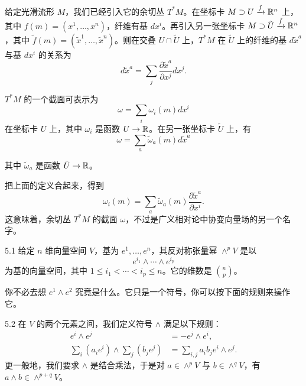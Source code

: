 给定光滑流形 $M$，我们已经引入它的余切丛 $T^*M$。在坐标卡 $M\supset U\xrightarrow{f}\mathbb{R}^n$ 上，其中 $f(m)=(x^1,\dots,x^n)$，纤维有基 $dx^i$。再引入另一张坐标卡 $M\supset\tilde U\xrightarrow{\tilde f}\mathbb{R}^n$，其中 $\tilde f(m)=(\tilde x^1,\dots,\tilde x^n)$。则在交叠 $U\cap\tilde U$ 上，$T^*M$ 在 $\tilde U$ 上的纤维的基 $d\tilde x^a$ 与基 $dx^i$ 的关系为
\begin{equation}
  d\tilde x^a=\sum_j\frac{\partial\tilde x^a}{\partial x^j}dx^j.
  \tag{5.1}
\end{equation}

$T^*M$ 的一个截面可表示为
\begin{equation}
  \omega=\sum_i\omega_i(m)dx^i
  \tag{5.2}
\end{equation}
在坐标卡 $U$ 上，其中 $\omega_i$ 是函数 $U\to\mathbb{R}$。在另一张坐标卡 $\tilde U$ 上，有
\begin{equation}
  \omega=\sum_a\tilde\omega_a(m)d\tilde x^a
  \tag{5.3}
\end{equation}

其中 $\tilde\omega_a$ 是函数 $\tilde U\to\mathbb{R}$。

把上面的定义合起来，得到
\begin{equation}
  \omega_i(m)=\sum_a\tilde\omega_a(m)\frac{\partial\tilde x^a}{\partial x^i}.
  \tag{5.4}
\end{equation}
这意味着，余切丛 $T^*M$ 的截面 $\omega$，不过是广义相对论中协变向量场的另一个名字。

\begin{definition}{5.1}
  给定 $n$ 维向量空间 $V$，基为 $e^1,\dots,e^n$，其反对称张量幂 $\wedge^pV$ 是以
  \begin{equation}
    e^{i_1}\wedge\cdots\wedge e^{i_p}
    \tag{5.5}
  \end{equation}
  为基的向量空间，其中 $1\le i_1<\cdots<i_p\le n$。它的维数是 $\binom{n}{p}$。
\end{definition}

你不必去想 $e^1\wedge e^2$ 究竟是什么。它只是一个符号，你可以按下面的规则来操作它。

\begin{definition}{5.2}
  在 $V$ 的两个元素之间，我们定义符号 $\wedge$ 满足以下规则：
  \begin{align}
    e^i\wedge e^j&=-e^j\wedge e^i, \tag{5.6}\\
    \sum_i(a_ie^i)\wedge\sum_j(b_je^j)&=\sum_{i,j}a_ib_je^i\wedge e^j. \tag{5.7}
  \end{align}
  更一般地，我们要求 $\wedge$ 是结合乘法，于是对 $a\in\wedge^pV$ 与 $b\in\wedge^qV$，有 $a\wedge b\in\wedge^{p+q}V$。
\end{definition}

